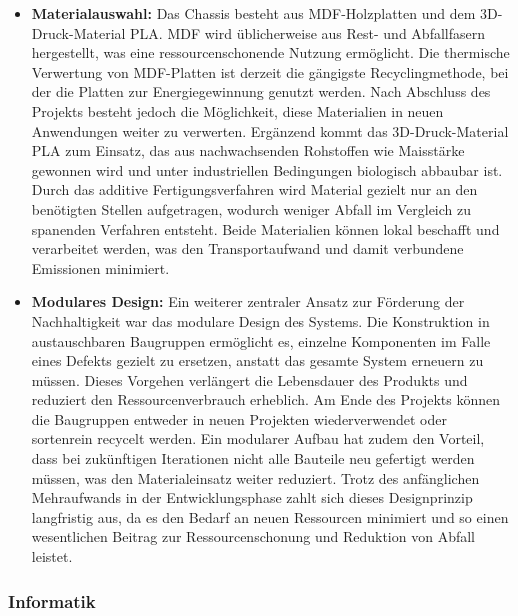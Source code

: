 \documentclass[../../main.tex]{subfiles} %
\begin{document}
\begin{itemize}
      \item \textbf{Materialauswahl:}
            Das Chassis besteht aus MDF-Holzplatten und dem 3D-Druck-Material PLA. MDF wird 
            üblicherweise aus Rest- und Abfallfasern hergestellt, was eine ressourcenschonende 
            Nutzung ermöglicht. Die thermische Verwertung von MDF-Platten ist derzeit die gängigste 
            Recyclingmethode, bei der die Platten zur Energiegewinnung genutzt werden. Nach Abschluss 
            des Projekts besteht jedoch die Möglichkeit, diese Materialien in neuen Anwendungen weiter 
            zu verwerten. Ergänzend kommt das 3D-Druck-Material PLA zum Einsatz, das aus nachwachsenden 
            Rohstoffen wie Maisstärke gewonnen wird und unter industriellen Bedingungen biologisch abbaubar 
            ist. Durch das additive Fertigungsverfahren wird Material gezielt nur an den benötigten Stellen 
            aufgetragen, wodurch weniger Abfall im Vergleich zu spanenden Verfahren entsteht. Beide Materialien 
            können lokal beschafft und verarbeitet werden, was den Transportaufwand und damit verbundene 
            Emissionen minimiert.

      \item \textbf{Modulares Design:}
            Ein weiterer zentraler Ansatz zur Förderung der Nachhaltigkeit war das modulare Design des Systems. 
            Die Konstruktion in austauschbaren Baugruppen ermöglicht es, einzelne Komponenten im Falle eines Defekts 
            gezielt zu ersetzen, anstatt das gesamte System erneuern zu müssen. Dieses Vorgehen verlängert die Lebensdauer 
            des Produkts und reduziert den Ressourcenverbrauch erheblich. Am Ende des Projekts können die Baugruppen 
            entweder in neuen Projekten wiederverwendet oder sortenrein recycelt werden. Ein modularer Aufbau hat zudem 
            den Vorteil, dass bei zukünftigen Iterationen nicht alle Bauteile neu gefertigt werden müssen, was den 
            Materialeinsatz weiter reduziert. Trotz des anfänglichen Mehraufwands in der Entwicklungsphase zahlt sich 
            dieses Designprinzip langfristig aus, da es den Bedarf an neuen Ressourcen minimiert und so einen wesentlichen 
            Beitrag zur Ressourcenschonung und Reduktion von Abfall leistet.

\end{itemize}

\subsubsection{Informatik}
\end{document}
